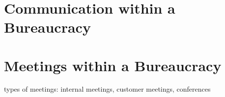 \documentclass{book}
\begin{document}
  \section{Communication within a Bureaucracy}
    
    
    
  \section{Meetings within a Bureaucracy}
    types of meetings: internal meetings, customer meetings, conferences 
    
    
    
    
    
    
    








\clearpage

\printglossaries

\nocite{*} %


\end{document}

